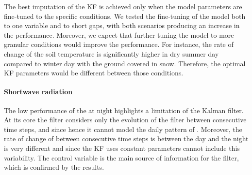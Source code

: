 \documentclass{article}
\begin{document}
The best imputation of the KF is achieved only when the model parameters are fine-tuned to the specific conditions. We tested the fine-tuning of the model both to one variable and to short gaps, with both scenarios producing an increase in the performance. Moreover, we expect that further tuning the model to more granular conditions would improve the performance. For instance, the rate of change of the soil temperature is significantly  higher in dry summer day compared to winter day with the ground covered in snow. Therefore, the optimal KF parameters would be different between those conditions.







\paragraph{Shortwave radiation} The low performance of the  at night highlights a limitation of the Kalman filter.  At its core the filter considers only the evolution of the filter between consecutive time steps, and since  hence it cannot model the daily pattern of . Moreover, the rate of change of  between consecutive time steps is between the day and the night is very different and since the KF uses constant parameters cannot include this variability. The control variable is the main source of information for the filter, which is confirmed by the results.
\end{document}
